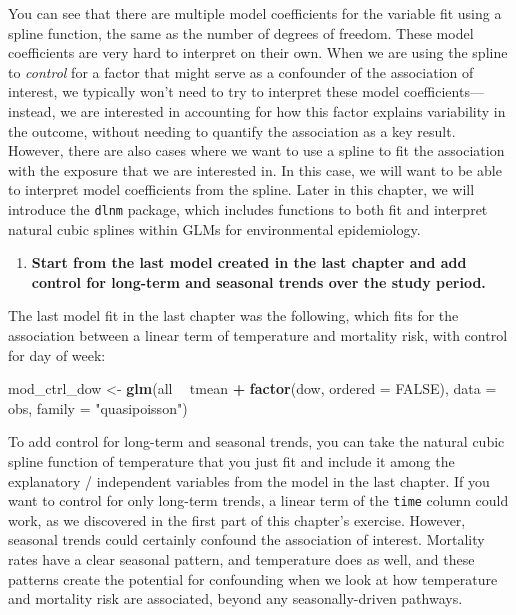 \documentclass[
]{book}
\newenvironment{Shaded}{\begin{snugshade}}{\end{snugshade}}
\newcommand{\DataTypeTok}[1]{\textcolor[rgb]{0.13,0.29,0.53}{#1}}
\newcommand{\KeywordTok}[1]{\textcolor[rgb]{0.13,0.29,0.53}{\textbf{#1}}}
\newcommand{\NormalTok}[1]{#1}
\newcommand{\OperatorTok}[1]{\textcolor[rgb]{0.81,0.36,0.00}{\textbf{#1}}}
\newcommand{\OtherTok}[1]{\textcolor[rgb]{0.56,0.35,0.01}{#1}}
\newcommand{\StringTok}[1]{\textcolor[rgb]{0.31,0.60,0.02}{#1}}
\providecommand{\tightlist}{%
  \setlength{\itemsep}{0pt}\setlength{\parskip}{0pt}}
\begin{document}
You can see that there are multiple model coefficients for the variable fit
using a spline function, the same as the number of degrees of freedom. These
model coefficients are very hard to interpret on their own. When we are using
the spline to \emph{control} for a factor that might serve as a confounder of the
association of interest, we typically won't need to try to interpret these
model coefficients---instead, we are interested in accounting for how this
factor explains variability in the outcome, without needing to quantify the
association as a key result. However, there are also cases where we want to
use a spline to fit the association with the exposure that we are interested
in. In this case, we will want to be able to interpret model coefficients from
the spline. Later in this chapter, we will introduce the \texttt{dlnm} package, which
includes functions to both fit and interpret natural cubic splines within
GLMs for environmental epidemiology.

\begin{enumerate}
\def\labelenumi{\arabic{enumi}.}
\setcounter{enumi}{1}
\tightlist
\item
  \textbf{Start from the last model created in the last chapter and add control for
  long-term and seasonal trends over the study period.}
\end{enumerate}

The last model fit in the last chapter was the following, which fits for the
association between a linear term of temperature and mortality risk, with control
for day of week:

\begin{Shaded}
\begin{Highlighting}[]
\NormalTok{mod_ctrl_dow <-}\StringTok{ }\KeywordTok{glm}\NormalTok{(all }\OperatorTok{~}\StringTok{ }\NormalTok{tmean }\OperatorTok{+}\StringTok{ }\KeywordTok{factor}\NormalTok{(dow, }\DataTypeTok{ordered =} \OtherTok{FALSE}\NormalTok{), }
                    \DataTypeTok{data =}\NormalTok{ obs, }\DataTypeTok{family =} \StringTok{"quasipoisson"}\NormalTok{)}
\end{Highlighting}
\end{Shaded}

To add control for long-term and seasonal trends, you can take the natural cubic
spline function of temperature that you just fit and include it among the
explanatory / independent variables from the model in the last chapter. If you
want to control for only long-term trends, a linear term of the \texttt{time} column
could work, as we discovered in the first part of this chapter's exercise.
However, seasonal trends could certainly confound the association of interest.
Mortality rates have a clear seasonal pattern, and temperature does as well,
and these patterns create the potential for confounding when we look at how
temperature and mortality risk are associated, beyond any seasonally-driven
pathways.
\end{document}
